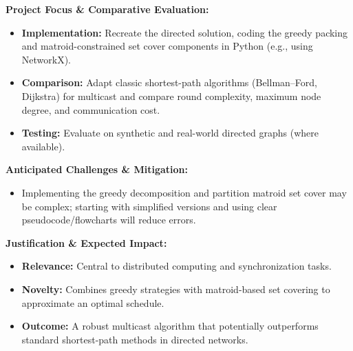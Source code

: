 \documentclass[12pt]{article}
\begin{document}
\noindent
\textbf{Project Focus \& Comparative Evaluation:}
\begin{itemize}[leftmargin=0.7cm]
    \item \textbf{Implementation:} Recreate the directed solution, coding the greedy packing and matroid-constrained set cover components in Python (e.g., using NetworkX).
    \item \textbf{Comparison:} Adapt classic shortest-path algorithms (Bellman--Ford, Dijkstra) for multicast and compare round complexity, maximum node degree, and communication cost.
    \item \textbf{Testing:} Evaluate on synthetic and real-world directed graphs (where available).
\end{itemize}

\vspace{0.2cm}

\noindent
\textbf{Anticipated Challenges \& Mitigation:}
\begin{itemize}[leftmargin=0.7cm]
    \item Implementing the greedy decomposition and partition matroid set cover may be complex; starting with simplified versions and using clear pseudocode/flowcharts will reduce errors.
\end{itemize}

\vspace{0.2cm}

\noindent
\textbf{Justification \& Expected Impact:}
\begin{itemize}[leftmargin=0.7cm]
    \item \textbf{Relevance:} Central to distributed computing and synchronization tasks.
    \item \textbf{Novelty:} Combines greedy strategies with matroid-based set covering to approximate an optimal schedule.
    \item \textbf{Outcome:} A robust multicast algorithm that potentially outperforms standard shortest-path methods in directed networks.
\end{itemize}
\end{document}

